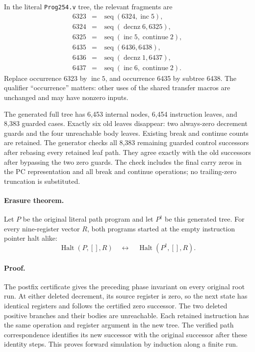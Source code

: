 In the literal \texttt{Prog254.v} tree, the relevant fragments are
\[
\begin{array}{rcl}
6323&=&\operatorname{seq}(6324,\operatorname{inc}5),\\
6324&=&\operatorname{seq}(\operatorname{decnz}6,6325),\\
6325&=&\operatorname{seq}(\operatorname{inc}5,\operatorname{continue}2),\\[2pt]
6435&=&\operatorname{seq}(6436,6438),\\
6436&=&\operatorname{seq}(\operatorname{decnz}1,6437),\\
6437&=&\operatorname{seq}(\operatorname{inc}6,\operatorname{continue}2).
\end{array}
\]
Replace occurrence 6323 by $\operatorname{inc}5$, and occurrence 6435 by
subtree 6438.  The qualifier ``occurrence'' matters: other uses of the
shared transfer macros are unchanged and may have nonzero inputs.

The generated full tree has 6,453 internal nodes, 6,454 instruction leaves,
and 8,383 guarded cases.  Exactly six old leaves disappear: two always-zero
decrement guards and the four unreachable body leaves.  Existing break
and continue counts are retained.  The generator checks all 8,383 remaining
guarded control successors after rebasing every retained leaf path.  They
agree exactly with the old successors after bypassing the two zero guards.
The check includes the final carry zeros in the PC representation and all
break and continue operations; no trailing-zero truncation is substituted.

\paragraph{Erasure theorem.}
Let $P$ be the original literal path program and let $P^{\dagger}$ be this
generated tree.  For every nine-register vector $R$, both programs started
at the empty instruction pointer halt alike:
\[
 \operatorname{Halt}(P,[],R)
 \quad\longleftrightarrow\quad
 \operatorname{Halt}(P^{\dagger},[],R).
\]

\paragraph{Proof.}
The postfix certificate gives the preceding phase invariant on every
original root run.  At either deleted decrement, its source register is
zero, so the next state has identical registers and follows the certified
zero successor.  The two deleted positive branches and their bodies are
unreachable.  Each retained instruction has the same operation and register
argument in the new tree.  The verified path correspondence identifies its
new successor with the original successor after these identity steps.
This proves forward simulation by induction along a finite run.

